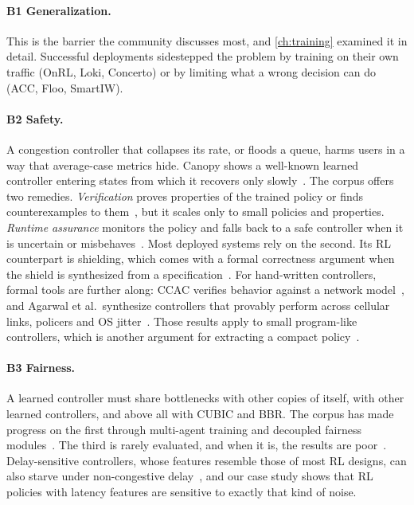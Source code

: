 \paragraph{B1 Generalization.} This is the barrier the community discusses most, and \cref{ch:training} examined it in detail. Successful deployments sidestepped the problem by training on their own traffic (OnRL, Loki, Concerto) or by limiting what a wrong decision can do (ACC, Floo, SmartIW).

\paragraph{B2 Safety.} A congestion controller that collapses its rate, or floods a queue, harms users in a way that average-case metrics hide. Canopy shows a well-known learned controller entering states from which it recovers only slowly~\cite{yang2024canopy}. The corpus offers two remedies. \emph{Verification} proves properties of the trained policy or finds counterexamples to them~\cite{kazak2019verily,eliyahu2021whirl,zangooei2026analyzing}, but it scales only to small policies and properties. \emph{Runtime assurance} monitors the policy and falls back to a safe controller when it is uncertain or misbehaves~\cite{rotman2020online,zhang2020onrl,jia2026han,kai2025robust}. Most deployed systems rely on the second. Its RL counterpart is shielding, which comes with a formal correctness argument when the shield is synthesized from a specification~\cite{alshiekh2018safe}. For hand-written controllers, formal tools are further along: CCAC verifies behavior against a network model~\cite{arun2021ccac}, and Agarwal et al.\ synthesize controllers that provably perform across cellular links, policers and OS jitter~\cite{agarwal2024towards}. Those results apply to small program-like controllers, which is another argument for extracting a compact policy~\cite{bastani2018verifiable}.

\paragraph{B3 Fairness.} A learned controller must share bottlenecks with other copies of itself, with other learned controllers, and above all with CUBIC and BBR. The corpus has made progress on the first through multi-agent training and decoupled fairness modules~\cite{liao2024astraea,tian2025jury}. The third is rarely evaluated, and when it is, the results are poor~\cite{giacomoni2024rlcc}. Delay-sensitive controllers, whose features resemble those of most RL designs, can also starve under non-congestive delay~\cite{arun2022starvation}, and our case study shows that RL policies with latency features are sensitive to exactly that kind of noise.

